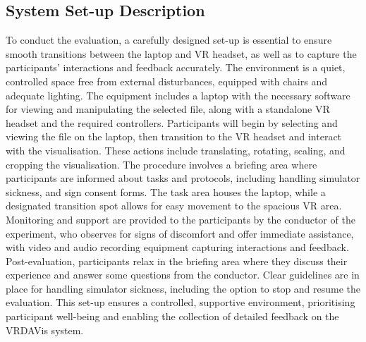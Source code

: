 \subsection{System Set-up Description}
To conduct the evaluation, a carefully designed set-up is essential to ensure smooth transitions between the laptop and VR headset, as well as to capture the participants' interactions and feedback accurately. 
The environment is a quiet, controlled space free from external disturbances, equipped with chairs and adequate lighting. 
The equipment includes a laptop with the necessary software for viewing and manipulating the selected file, along with a standalone VR headset and the required controllers. 
Participants will begin by selecting and viewing the file on the laptop, then transition to the VR headset and interact with the visualisation.
These actions include translating, rotating, scaling, and cropping the visualisation. 
The procedure involves a briefing area where participants are informed about tasks and protocols, including handling simulator sickness, and sign consent forms. 
The task area houses the laptop, while a designated transition spot allows for easy movement to the spacious VR area. 
Monitoring and support are provided to the participants by the conductor of the experiment, who observes for signs of discomfort and offer immediate assistance, with video and audio recording equipment capturing interactions and feedback. 
Post-evaluation, participants relax in the briefing area where they discuss their experience and answer some questions from the conductor. 
Clear guidelines are in place for handling simulator sickness, including the option to stop and resume the evaluation. 
This set-up ensures a controlled, supportive environment, prioritising participant well-being and enabling the collection of detailed feedback on the VRDAVis system.

